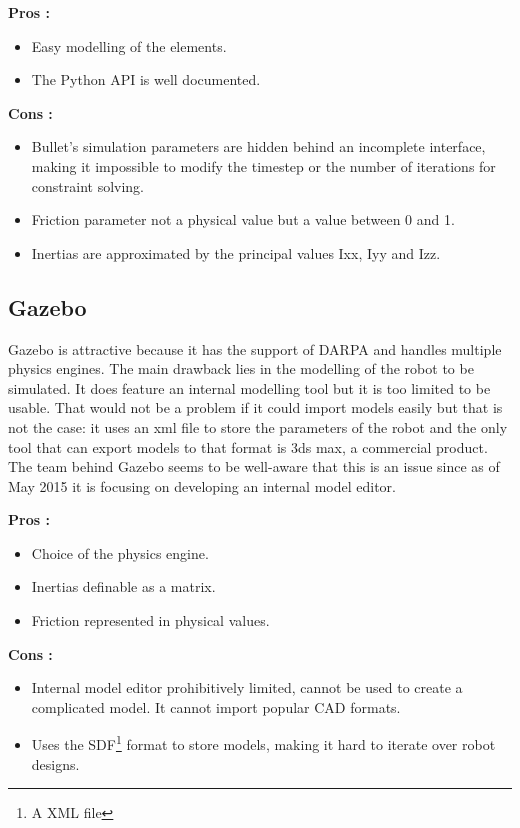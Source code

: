 \textbf{Pros :}
\begin{itemize}
\item Easy modelling of the elements.
\item The Python API is well documented.
\end{itemize}

\textbf{Cons :}
\begin{itemize}
\item Bullet's simulation parameters are hidden behind an incomplete interface, making it impossible to modify the timestep or the number of iterations for constraint solving.
\item Friction parameter not a physical value but a value between 0 and 1.
\item Inertias are approximated by the principal values Ixx, Iyy and Izz.
\end{itemize}

\subsection{Gazebo}
Gazebo is attractive because it has the support of DARPA and handles multiple physics engines. The main drawback lies in the modelling of the robot to be simulated. It does feature an internal modelling tool but it is too limited to be usable. That would not be a problem if it could import models easily but that is not the case: it uses an xml file to store the parameters of the robot and the only tool that can export models to that format is 3ds max, a commercial product. The team behind Gazebo seems to be well-aware that this is an issue since as of May 2015 it is focusing on developing an internal model editor.

\textbf{Pros :}
\begin{itemize}
\item Choice of the physics engine.
\item Inertias definable as a matrix.
\item Friction represented in physical values.
\end{itemize}

\textbf{Cons :}
\begin{itemize}
\item Internal model editor prohibitively limited, cannot be used to create a complicated model. It cannot import popular CAD formats.
\item Uses the SDF\footnote{A XML file} format to store models, making it hard to iterate over robot designs.
\end{itemize}

